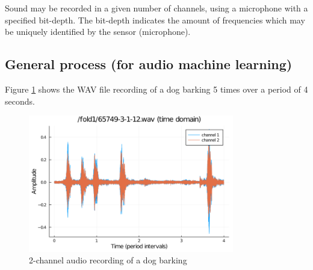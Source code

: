 \documentclass[a4paper,12pt]{article}
\numberwithin{equation}{section}
\numberwithin{figure}{section}
\numberwithin{table}{section}
\begin{document}





Sound may be recorded in a given number of channels, using a microphone with a specified bit-depth. The bit-depth indicates the amount of frequencies which may be uniquely identified by the sensor (microphone).





\subsection{General process (for audio machine learning)}
Figure \ref{wav_example} shows the WAV file recording of a dog barking 5 times over a period of 4 seconds.

\begin{figure}[h!]
    \centering %
    \includegraphics[padding=1ex,width=0.8\textwidth,frame]{img/wav_example.png}
    \caption{2-channel audio recording of a dog barking}
    \label{wav_example}
\end{figure}
\end{document}
